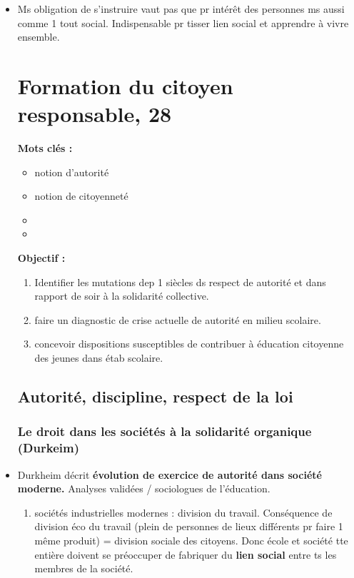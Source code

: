 \documentclass[12pt]{report}
\begin{document}
\begin{itemize}
\item Ms obligation de s'instruire vaut pas que pr intérêt des personnes ms aussi comme 1 tout social.  Indispensable pr tisser lien social et apprendre à vivre ensemble.


\chapter{Formation du citoyen responsable, 28}


\textbf{Mots clés : } \\
\begin{itemize}
\item notion d'autorité
\item notion de citoyenneté
\item 
\item 
\end{itemize}

\vspace{0.5cm}

\textbf{Objectif :} \\
\begin{enumerate}
\item Identifier les mutations dep 1 siècles ds respect de autorité et dans rapport de soir à la solidarité collective.
\item faire un diagnostic de crise actuelle de autorité en milieu scolaire.
\item concevoir dispositions susceptibles de contribuer à éducation citoyenne des jeunes dans étab scolaire. \\
\end{enumerate}


\section{Autorité, discipline, respect de la loi}

\subsection{Le droit dans les sociétés à la solidarité organique (Durkeim)}

\item Durkheim décrit \textbf{évolution de exercice de autorité dans société moderne.} Analyses validées / sociologues de l'éducation. \\
\begin{enumerate}
\item sociétés industrielles modernes :  division du travail. Conséquence de division éco du travail (plein de personnes de lieux différents pr faire 1 même produit) = division sociale des citoyens. Donc école et société tte entière doivent se préoccuper de fabriquer du \textbf{lien social} entre ts les membres de la société.
\end{enumerate}


\end{itemize}
\end{document}
